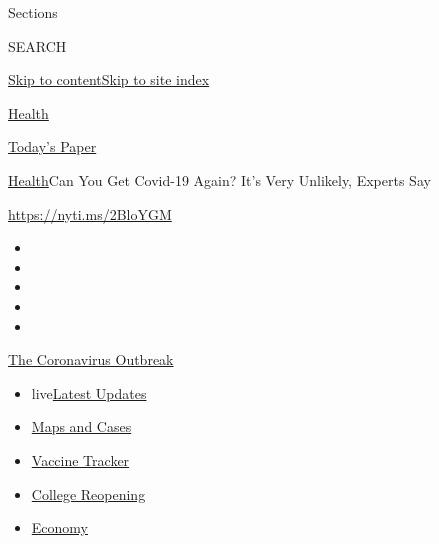 Sections

SEARCH

\protect\hyperlink{site-content}{Skip to
content}\protect\hyperlink{site-index}{Skip to site index}

\href{https://www.nytimes.com/section/health}{Health}

\href{https://myaccount.nytimes.com/auth/login?response_type=cookie\&client_id=vi}{}

\href{https://www.nytimes.com/section/todayspaper}{Today's Paper}

\href{/section/health}{Health}\textbar{}Can You Get Covid-19 Again? It's
Very Unlikely, Experts Say

\url{https://nyti.ms/2BloYGM}

\begin{itemize}
\item
\item
\item
\item
\item
\end{itemize}

\href{https://www.nytimes.com/news-event/coronavirus?action=click\&pgtype=Article\&state=default\&region=TOP_BANNER\&context=storylines_menu}{The
Coronavirus Outbreak}

\begin{itemize}
\tightlist
\item
  live\href{https://www.nytimes.com/2020/08/03/world/coronavirus-covid-19.html?action=click\&pgtype=Article\&state=default\&region=TOP_BANNER\&context=storylines_menu}{Latest
  Updates}
\item
  \href{https://www.nytimes.com/interactive/2020/us/coronavirus-us-cases.html?action=click\&pgtype=Article\&state=default\&region=TOP_BANNER\&context=storylines_menu}{Maps
  and Cases}
\item
  \href{https://www.nytimes.com/interactive/2020/science/coronavirus-vaccine-tracker.html?action=click\&pgtype=Article\&state=default\&region=TOP_BANNER\&context=storylines_menu}{Vaccine
  Tracker}
\item
  \href{https://www.nytimes.com/2020/08/02/us/covid-college-reopening.html?action=click\&pgtype=Article\&state=default\&region=TOP_BANNER\&context=storylines_menu}{College
  Reopening}
\item
  \href{https://www.nytimes.com/live/2020/08/03/business/stock-market-today-coronavirus?action=click\&pgtype=Article\&state=default\&region=TOP_BANNER\&context=storylines_menu}{Economy}
\end{itemize}

